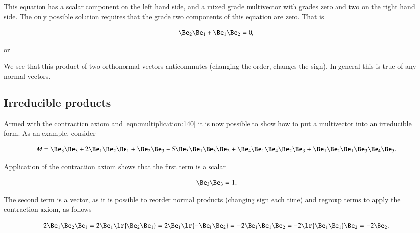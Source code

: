 This equation has a scalar component on the left hand side, and a mixed grade multivector with grades zero and two on the right hand side.
The only possible solution requires that the grade two components of this equation are zero.  That is

\begin{dmath}\label{eqn:multivector:280}
\Be_2 \Be_1 + \Be_1 \Be_2 = 0,
\end{dmath}

or

We see that this product of two orthonormal vectors anticommutes (changing the order, changes the sign).  In general this is true of any normal vectors.


\subsection{Irreducible products}

Armed with the contraction axiom and \cref{eqn:multiplication:140} it is now possible to show how to put a multivector into an irreducible form.  As an example, consider

\begin{equation}\label{eqn:SimpleProducts:20}
M = \Be_3 \Be_3 + 2 \Be_1 \Be_2 \Be_1 + \Be_2 \Be_3 - 5 \Be_3 \Be_1 \Be_3 \Be_2 + \Be_4 \Be_1 \Be_4 \Be_2 \Be_3 + \Be_1 \Be_2 \Be_1 \Be_3 \Be_4 \Be_5.
\end{equation}

Application of the contraction axiom shows that the first term is a scalar

\begin{equation}\label{eqn:SimpleProducts:40}
\Be_3 \Be_3 = 1.
\end{equation}

The second term is a vector, as it is possible to reorder normal products (changing sign each time) and regroup terms to apply the contraction axiom, as follows

\begin{dmath}\label{eqn:SimpleProducts:60}
2 \Be_1 \Be_2 \Be_1
=
2 \Be_1 \lr{ \Be_2 \Be_1 }
=
2 \Be_1 \lr{ - \Be_1 \Be_2 }
=
-2 \Be_1 \Be_1 \Be_2
=
-2 \lr{ \Be_1 \Be_1 } \Be_2
=
-2 \Be_2.
\end{dmath}

